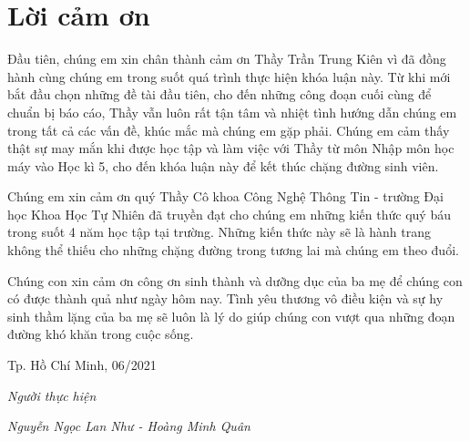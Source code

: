 \chapter*{Lời cảm ơn}
\label{thanks}

Đầu tiên, chúng em xin chân thành cảm ơn Thầy Trần Trung Kiên vì đã đồng hành cùng chúng em trong suốt quá trình thực hiện khóa luận này. Từ khi mới bắt đầu chọn những đề tài đầu tiên, cho đến những công đoạn cuối cùng để chuẩn bị báo cáo, Thầy vẫn luôn rất tận tâm và nhiệt tình hướng dẫn chúng em trong tất cả các vấn đề, khúc mắc mà chúng em gặp phải. Chúng em cảm thấy thật sự may mắn khi được học tập và làm việc với Thầy từ môn Nhập môn học máy vào Học kì 5, cho đến khóa luận này để kết thúc chặng đường sinh viên.

Chúng em xin cảm ơn quý Thầy Cô khoa Công Nghệ Thông Tin - trường Đại học Khoa Học Tự Nhiên đã truyền đạt cho chúng em những kiến thức quý báu trong suốt 4 năm học tập tại trường. Những kiến thức này sẽ là hành trang không thể thiếu cho những chặng đường trong tương lai mà chúng em theo đuổi.

Chúng con xin cảm ơn công ơn sinh thành và dưỡng dục của ba mẹ để chúng con có được thành quả như ngày hôm nay. Tình yêu thương vô điều kiện và sự hy sinh thầm lặng của ba mẹ sẽ luôn là lý do giúp chúng con vượt qua những đoạn đường khó khăn trong cuộc sống.

\hfill Tp. Hồ Chí Minh, 06/2021

\hfill \textit{Người thực hiện}

\hfill \textit{Nguyễn Ngọc Lan Như - Hoàng Minh Quân}